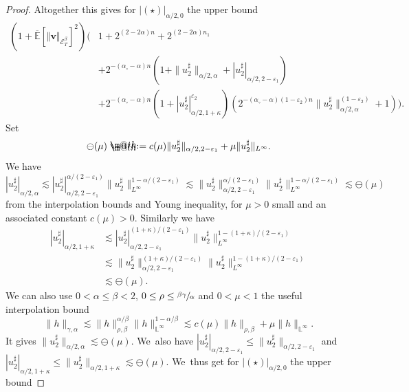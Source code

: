 \documentclass[10pt]{amsart}
\makeatletter
\theoremstyle{definition}
\let\epsilon\varepsilon
\newcommand\bbE{\mathbb{E}}
\newcommand{\mcE}{\mathcal{E}}
\newcommand{\bsv}{\boldsymbol{v}}
\newcommand*{\defeq}{\mathrel{\rlap{%
\raisebox{0.3ex}{$\m@th\cdot$}}%
\raisebox{-0.3ex}{$\m@th\cdot$}}%
=}
\newcommand{\norme}[1]{\Vert #1 \Vert}
\makeatother
\begin{document}
\begin{proof}
Altogether this gives for $| (\star) |_{\alpha / 2, 0}$ the upper bound
\begin{align*}
(1+ \overline{\bbE}[\norme{\bsv}_{\mcE^\beta_T}]^2)\bigl( &1 + 2^{(2 - 2 \alpha) n} + 2^{(2 - 2 \alpha) n_1}
\\
& + 2^{- (\alpha_{\circ} - \alpha) n} (1 + \| u^{\sharp}_2 \|_{\alpha
/ 2, \alpha} + | u_2^{\sharp} |_{\alpha / 2, 2 - \epsilon_1})
\\
& + 2^{- (\alpha_{\circ} - \alpha) n} (1 + |
u_2^{\sharp} |^{\epsilon_2}_{\alpha / 2, 1 + \kappa}) (2^{-
(\alpha_{\circ} - \alpha) (1 - \epsilon_2) n} \| u_2^{\sharp} \|^{(1 -
\epsilon_2)}_{\alpha / 2, \alpha} + 1) \bigr).
\end{align*}
Set
\[
\ominus (\mu) \defeq c (\mu) \| u_2^{\sharp} \|_{\alpha / 2, 2 -
\epsilon_1} + \mu \| u_2^{\sharp} \|_{L^{\infty}}.
\]
We have
\[
| u_2^{\sharp} |_{\alpha / 2, \alpha} \lesssim | u_2^{\sharp} |_{\alpha /
2, 2 - \epsilon_1}^{\alpha / (2 - \epsilon_1)} \| u_2^{\sharp}
\|_{L^{\infty}}^{1 - \alpha / (2 - \epsilon_1)}\lesssim \|
u_2^{\sharp} \|_{\alpha / 2, 2 - \epsilon_1}^{\alpha / (2 - \epsilon_1)}
\| u_2^{\sharp} \|_{L^{\infty}}^{1 - \alpha / (2 - \epsilon_1)} \lesssim
\ominus (\mu)
\]
from the interpolation bounds and Young inequality, for $\mu > 0$ small and an associated constant $c (\mu) > 0$. Similarly we have
\begin{equation*} \begin{split}
| u_2^{\sharp} |_{\alpha / 2, 1 + \kappa} &\lesssim
| u_2^{\sharp} |_{\alpha / 2, 2 - \epsilon_1}^{(1 + \kappa) / (2 -
\epsilon_1)} \| u_2^{\sharp} \|_{L^{\infty}}^{1 - (1 + \kappa) / (2 -
\epsilon_1)} \\
&\lesssim \| u_2^{\sharp} \|_{\alpha / 2, 2 -
\epsilon_1}^{(1 + \kappa) / (2 - \epsilon_1)} \| u_2^{\sharp}
\|_{L^{\infty}}^{1 - (1 + \kappa) / (2 - \epsilon_1)} \\
&\lesssim \ominus (\mu).
\end{split} \end{equation*}
We can also use $0 < \alpha \leq \beta < 2$, $0 \leq \rho \leq \sfrac{\beta \gamma}{\alpha}$ and $0 < \mu < 1$ the useful interpolation bound
\[
\| h \|_{\gamma, \alpha} \lesssim \| h \|_{\rho, \beta}^{\alpha / \beta} \|
h \|_{\mathbb{L}^{\infty}}^{1 - \alpha / \beta} \lesssim c (\mu) \| h
\|_{\rho, \beta} + \mu \| h \|_{\mathbb{L}^{\infty}}.
\]
It gives $\| u_2^{\sharp} \|_{\alpha / 2, \alpha} \lesssim \ominus (\mu)$. We~also have $| u_2^{\sharp} |_{\alpha / 2, 2 - \epsilon_1} \leq \| u_2^{\sharp} \|_{\alpha / 2, 2 - \epsilon_1}$ and $| u_2^{\sharp} |_{\alpha / 2, 1 + \kappa} \leq \| u_2^{\sharp} \|_{\alpha / 2, 1 + \kappa} \lesssim \ominus (\mu)$. We~thus get for $| (\star) |_{\alpha / 2, 0}$ the upper bound

\end{proof}
\end{document}
